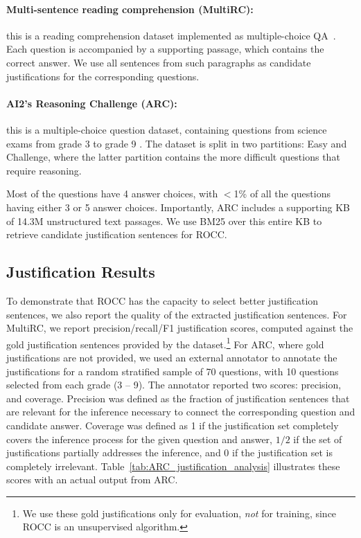 \paragraph{Multi-sentence reading comprehension (MultiRC): } this is a reading comprehension dataset implemented as multiple-choice QA~\cite{khashabi2018looking}. Each question is accompanied by a supporting passage, which contains the correct answer. We use all sentences from such paragraphs as candidate justifications for the corresponding questions.

\paragraph{AI2's Reasoning Challenge (ARC):} this is a multiple-choice question dataset, containing questions from science exams from grade 3 to grade 9 \cite{clark2018think}. The dataset is split in two partitions: Easy and Challenge, where the latter partition contains the more difficult questions that require reasoning. 

	Most of the questions have 4 answer choices, with $<$1\% of all the questions having either 3 or 5 answer choices. Importantly, ARC includes a supporting KB of 14.3M unstructured text passages. We use BM25 over this entire KB to retrieve candidate justification sentences for ROCC. 

\subsection{Justification Results} To demonstrate that ROCC has the capacity to select better justification sentences, we also report the quality of the extracted justification sentences. For MultiRC, we report precision/recall/F1 justification scores, computed against the gold justification sentences provided by the dataset.\footnote{We use these gold justifications only for evaluation, {\em not} for training, since ROCC is an unsupervised algorithm.} For ARC, where gold justifications are not provided, we used an external annotator  to annotate the justifications for a random stratified sample of 70 questions, with 10 questions selected from each grade (3 -- 9). The annotator reported two scores: precision,  and coverage. Precision was defined as the fraction of justification sentences that are relevant for the inference necessary to connect the corresponding question and candidate answer. Coverage was defined as 1 if the justification set completely covers the inference process for the given question and answer, $1/2$ if the set of justifications partially addresses the inference, and 0 if the justification set is completely irrelevant. Table~\ref{tab:ARC_justification_analysis} illustrates these scores with an actual output from ARC. 

